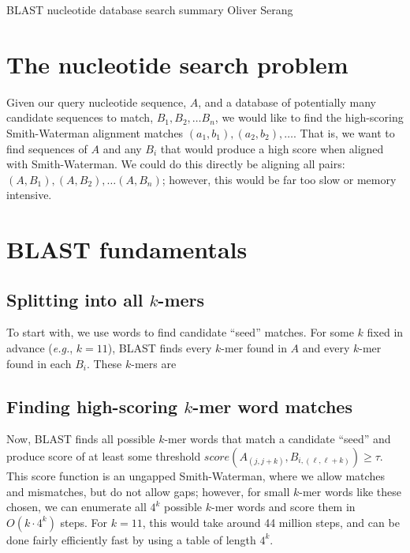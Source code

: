 \documentclass[12pt]{book}
\begin{document}
\noindent BLAST nucleotide database search summary\newline
\noindent Oliver Serang\newline

\section{The nucleotide search problem}
Given our query nucleotide sequence, $A$, and a database of
potentially many candidate sequences to match, $B_1, B_2, \ldots B_n$,
we would like to find the high-scoring Smith-Waterman alignment
matches $(a_1,b_1), (a_2,b_2), \ldots$. That is, we want to find
sequences of $A$ and any $B_i$ that would produce a high score when
aligned with Smith-Waterman. We could do this directly be aligning all
pairs: $(A,B_1), (A,B_2), \ldots (A,B_n)$; however, this would be far
too slow or memory intensive. 

\section{BLAST fundamentals}
\subsection{Splitting into all $k$-mers}
To start with, we use words to find candidate ``seed'' matches. For
some $k$ fixed in advance (\emph{e.g.}, $k=11$), BLAST finds every
$k$-mer found in $A$ and every $k$-mer found in each $B_i$. These
$k$-mers are 

\subsection{Finding high-scoring $k$-mer word matches}
Now, BLAST finds all possible $k$-mer words that match a candidate
``seed'' and produce score of at least some threshold
$score(A_{(j,j+k)},B_{i,(\ell,\ell+k)}) \geq \tau$. This score
function is an ungapped Smith-Waterman, where we allow matches and
mismatches, but do not allow gaps; however, for small $k$-mer words
like these chosen, we can enumerate all $4^k$ possible $k$-mer words
and score them in $O(k\cdot 4^k)$ steps. For $k=11$, this would take
around 44 million steps, and can be done fairly efficiently fast by
using a table of length $4^k$.
\end{document}

